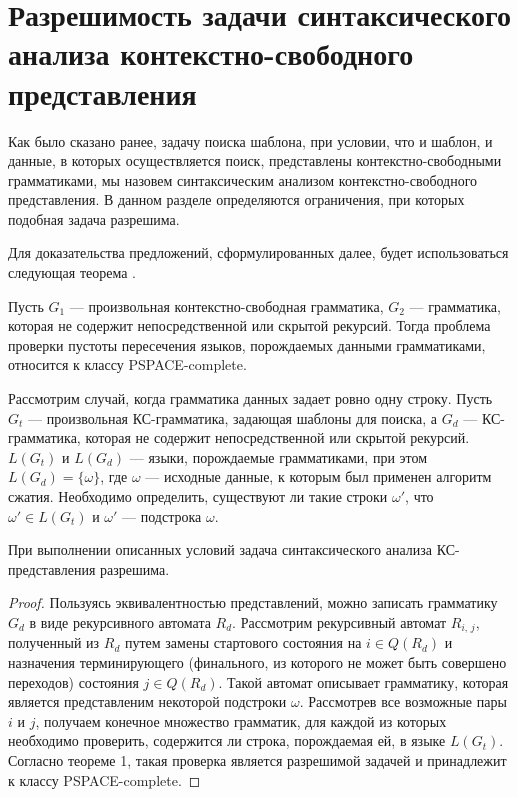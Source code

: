 \section{Разрешимость задачи синтаксического \\ анализа контекстно-свободного представления}
Как было сказано ранее, задачу поиска шаблона, при условии, что и шаблон, и данные, в которых осуществляется поиск, представлены контекстно-свободными грамматиками, мы назовем синтаксическим анализом контекстно-свободного представления. В данном разделе определяются ограничения, при которых подобная задача разрешима.

Для доказательства предложений, сформулированных далее, будет использоваться следующая теорема \cite{Nederhof}.

\begin{theorem}
	Пусть $G_1$ --- произвольная контекстно-свободная грамматика, $G_2$ --- грамматика, которая не содержит непосредственной или скрытой рекурсий. Тогда проблема проверки пустоты пересечения языков, порождаемых данными грамматиками, относится к классу PSPACE-complete.
\end{theorem}

Рассмотрим случай, когда грамматика данных задает ровно одну строку. Пусть $G_t$ --- произвольная КС-грамматика, задающая шаблоны для поиска, а $G_d$ --- КС-грамматика, которая не содержит непосредственной или скрытой рекурсий. $L(G_t)$ и $L(G_d)$ --- языки, порождаемые грамматиками, при этом $L(G_d) = \{\omega\}$, где $\omega$ --- исходные данные, к которым был применен алгоритм сжатия. 
Необходимо определить, существуют ли такие строки $\omega'$, что $\omega' \in L(G_t)$ и $\omega'$ --- подстрока $\omega$. 

\begin{prop}
	При выполнении описанных условий задача синтаксического анализа КС-представления разрешима.
\end{prop}

\begin{proof}
Пользуясь эквивалентностью представлений, можно записать грамматику $G_d$ в виде рекурсивного автомата $R_d$. Рассмотрим рекурсивный автомат $R_{i,\,j}$, полученный из $R_d$ путем замены стартового состояния на $i \in Q(R_d)$ и назначения терминирующего (финального, из которого не может быть совершено переходов) состояния $j \in Q(R_d)$. Такой автомат описывает грамматику, которая является представленим некоторой подстроки $\omega$. 
Рассмотрев все возможные пары $i$ и $j$, получаем конечное множество грамматик, для каждой из которых необходимо проверить, содержится ли строка, порождаемая ей, в языке $L(G_t)$. 
Согласно теореме 1, такая проверка является разрешимой задачей и принадлежит к классу PSPACE-complete.
\end{proof}

